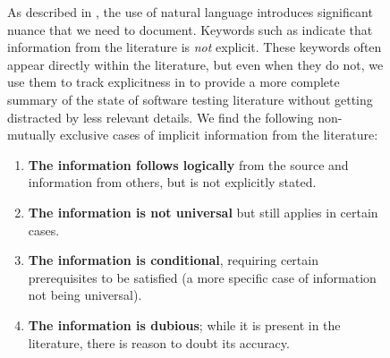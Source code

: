 \begin{figure}[h!]
As described in , the use of natural language introduces
significant nuance that we need to document. Keywords such as \impKeywords{}
indicate that information from the literature is \emph{not} explicit. These
keywords often appear directly within the literature, but even when they do
not, we use them to track explicitness in \ourApproachGlossary{} to
provide a more complete summary of the state of software testing literature
without getting distracted by less relevant details. We find the following
non-mutually exclusive cases of implicit information from the literature:

\begin{enumerate}
    \item \textbf{The information follows logically} from the source and
          information from others, but is not explicitly stated.
    \item \textbf{The information is not universal} but still applies in
          certain cases. \ifnotpaper
    \item \textbf{The information is conditional}, requiring certain
          prerequisites to be satisfied (a more specific case of information
          not being universal). \fi
    \item \textbf{The information is dubious}; while it is present in the
          literature, there is reason to doubt its accuracy.
\end{enumerate}


\end{figure}
